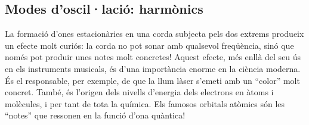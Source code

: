 \documentclass[12pt]{book}
\begin{document}
\subsection{Modes d'oscil·lació: harmònics}

La formació d'ones estacionàries en una corda subjecta pels dos extrems produeix un efecte molt curiós: la corda no pot sonar amb qualsevol freqüència, sinó que només pot produir unes notes molt concretes! Aquest efecte, més enllà del seu ús en els instruments musicals, és d'una importància enorme en la ciència moderna. És el responsable, per exemple, de que la llum làser s'emeti amb un ``color'' molt concret. També, és l'origen dels nivells d'energia dels electrons en àtoms i molècules, i per tant de tota la química. Els famosos orbitals atòmics són les ``notes'' que ressonen en la funció d'ona quàntica!
\end{document}
